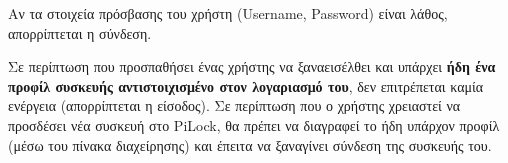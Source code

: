 		Αν τα στοιχεία πρόσβασης του χρήστη (Username, Password) είναι λάθος, απορρίπτεται η σύνδεση.

		Σε περίπτωση που προσπαθήσει ένας χρήστης να ξαναεισέλθει και υπάρχει \textbf{ήδη ένα προφίλ συσκευής αντιστοιχισμένο στον λογαριασμό του}, δεν επιτρέπεται καμία ενέργεια (απορρίπτεται η είσοδος). Σε περίπτωση που ο χρήστης χρειαστεί να προσδέσει νέα συσκευή στο PiLock, θα πρέπει να διαγραφεί το ήδη υπάρχον προφίλ (μέσω του πίνακα διαχείρησης) και έπειτα να ξαναγίνει σύνδεση της συσκευής του.